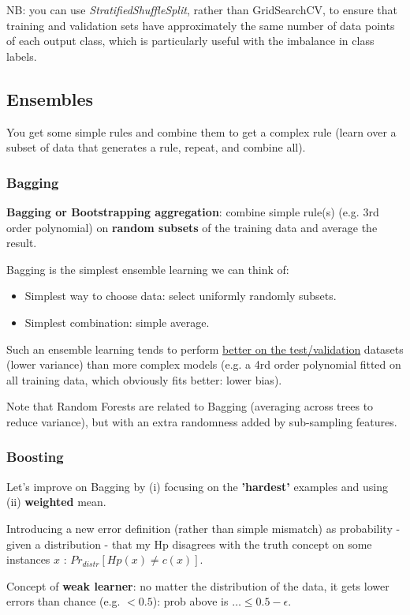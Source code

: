 \documentclass[11pt]{article}
\begin{document}
NB: you can use \textit{StratifiedShuffleSplit}, rather than GridSearchCV, to ensure that training and validation sets have approximately the same number of data points of each output class, which is particularly useful with the imbalance in class labels.

\subsection{Ensembles}
You get some simple rules and combine them to get a complex rule (learn over a subset of data that generates a rule, repeat, and combine all).

%
\subsubsection{Bagging}
\textbf{Bagging or Bootstrapping aggregation}: combine simple rule(s) (e.g. 3rd order polynomial) on \textbf{random subsets} of the training data and average the result. 

Bagging is the simplest ensemble learning we can think of: 
\begin{itemize}
	\item Simplest way to choose data: select uniformly randomly subsets.
	\item Simplest combination: simple average.
\end{itemize}

Such an ensemble learning tends to perform \underline{better on the test/validation} datasets (lower variance) than more complex models (e.g. a 4rd order polynomial fitted on all training data, which obviously fits better: lower bias).

Note that Random Forests are related to Bagging (averaging across trees to reduce variance), but with an extra randomness added by sub-sampling features.

%
\subsubsection{Boosting}
Let's improve on Bagging by (i) focusing on the \textbf{'hardest'} examples and using (ii) \textbf{weighted} mean.

Introducing a new error definition (rather than simple mismatch) as probability - given a distribution - that my Hp disagrees with the truth concept on some instances $x$ : $Pr_{distr}[Hp(x) \neq c(x)]$. 

Concept of \textbf{weak learner}: no matter the distribution of the data, it gets lower errors than chance (e.g. $<0.5$): prob above is $ \ldots \leq 0.5 - \epsilon$.
\end{document}
